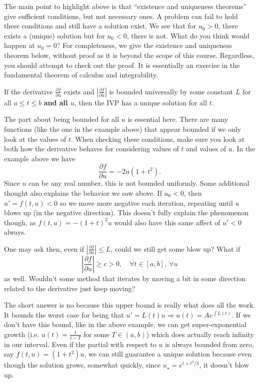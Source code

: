 \documentclass[11pt]{article}
\begin{document}
The main point to highlight above is that ``existence and uniqueness theorems'' give sufficient conditions, but not necessary ones. A problem can fail to hold these conditions and still have a solution exist. We see that for $u_0 > 0$, there exists a (unique) solution but for $u_0 < 0$, there is not. What do you think would happen at $u_0 = 0$? For completeness, we give the existence and uniqueness theorem below, without proof as it is beyond the scope of this course. Regardless, you should attempt to check out the proof. It is essentially an exercise in the fundamental theorem of calculus and integrability. 
\begin{theorem}\label{thm: existennce and uniqueness}
    If the derivative $\frac{\partial f}{\partial u}$ exists and $\left|\frac{\partial f}{\partial u}\right|$ is bounded universally by some constant $L$ for all $a \leq t \leq b$ \textbf{and all $u$}, then the IVP has a unique solution for all $t$. 
\end{theorem}
The part about being bounded for all $u$ is essential here. There are many functions (like the one in the example above) that appear bounded if we only look at the values of $t$. When checking these conditions, make sure you look at both how the derivative behaves for considering values of $t$ and values of $u$. In the example above we have $$\frac{\partial f}{\partial u} = -2u(1+t^2).$$ Since $u$ can be any real number, this is not bounded uniformly. Some additional thought also explains the behavior we saw above. If $u_0 < 0$, then $u' = f(t,u) < 0$ so we move more negative each iteration, repeating until $u$ blows up (in the negative direction). This doesn't fully explain the phenomenon though, as $f(t,u) = -(1+t)^2u$ would also have this same affect of $u' < 0$ always. 

\begin{remark}
    One may ask then, even if $\left|\frac{\partial f}{\partial u}\right| \leq L$, could we still get some blow up? What if $$\left|\frac{\partial f}{\partial u}\right| \geq c > 0, \quad \forall t \in [a,b], \ \forall u$$ as well. Wouldn't some method that iterates by moving a bit in some direction related to the derivative just keep moving? 
    
    The short answer is no because this upper bound is really what does all the work. It bounds the worst case for being that $u' = L(t)u \Longrightarrow u(t) = Ae^{\int L(t)}$. If we don't have this bound, like in the above example, we can get super-exponential growth (i.e. $u(t) = \frac{1}{t-T}$ for some $T \in (a,b)$) which does actually reach infinity in our interval. Even if the partial with respect to $u$ is always bounded from zero, say $f(t,u) = (1+t^2)u$, we can still guarantee a unique solution because even though the solution grows, somewhat quickly, since $u_\star = e^{t+t^3/3}$, it doesn't blow up.
\end{remark}
\end{document}
